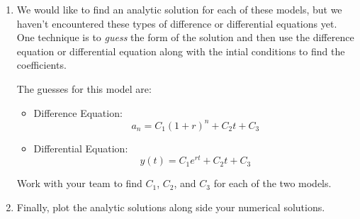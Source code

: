 \begin{lab}
\begin{enumerate}
    \item We would like to find an analytic solution for each of these models, but we
        haven't encountered these types of difference or differential equations yet.  One
        technique is to {\it guess} the form of the solution and then use the difference
        equation or differential equation along with the intial conditions to find the
        coefficients.

        The guesses for this model are:
        \begin{itemize}
            \item Difference Equation: 
                \[ a_n = C_1 (1+r)^n + C_2 t + C_3 \]
            \item Differential Equation: 
                \[ y(t) = C_1 e^{rt} + C_2 t + C_3 \]
        \end{itemize}
        Work with your team to find $C_1$, $C_2$, and $C_3$ for each of the two models.
    \item Finally, plot the analytic solutions along side your numerical solutions.
\end{enumerate}
\end{lab}


